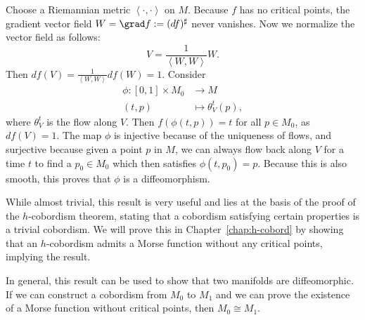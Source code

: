 \begin{myproof}
    \begin{marginfigure}
        \centering
        \caption{
            When a cobordism has no critical points, it is diffeomorphic to a product manifold. }
        \label{fig:proof-of-cobordism-without-critical-points}
    \end{marginfigure}
    Choose a Riemannian metric $\left<\cdot ,\cdot  \right>$ on $M$.
    Because  $f$ has no critical points, the gradient vector field $W = \grad f := (df)^{\sharp}$ never vanishes.
    Now we normalize the vector field as follows:
    \[
    V = \frac{1}{\left<W, W \right>} W
    .\] 
    Then $df(V) = \frac{1}{\left<W, W \right>} df(W) = 1$.
    Consider
    \begin{align*}
        \phi: [0, 1] \times M_0&\longrightarrow M \\
        (t, p) &\longmapsto \theta_V^{t}(p)
    ,\end{align*}
    where $\theta_V^{t}$ is the flow along $V$.
    Then $f(\phi(t, p)) = t$ for all $p \in M_0$, as $df(V) = 1$.
    The map $\phi$ is injective because of the uniqueness of flows, and surjective because given a point $p$ in $M$, we can always flow back along $V$ for a time $t$ to find a $p_0 \in M_0$ which then satisfies $\phi(t, p_0) = p$. 
    Because this is also smooth, this proves that $\phi$ is a diffeomorphism.
\end{myproof}

\begin{remark}
    While almost trivial, this result is very useful and lies at the basis of the proof of the $h$-cobordism theorem, stating that a cobordism satisfying certain properties is a trivial cobordism.
    We will prove this in Chapter~\ref{chap:h-cobord} by showing that an $h$-cobordism admits a Morse function without any critical points, implying the result.

    In general, this result can be used to show that two manifolds are diffeomorphic. If we can construct a cobordism from $M_0$ to $M_1$ and we can prove the existence of a Morse function without critical points, then $M_0 \cong M_1$.
\end{remark}

